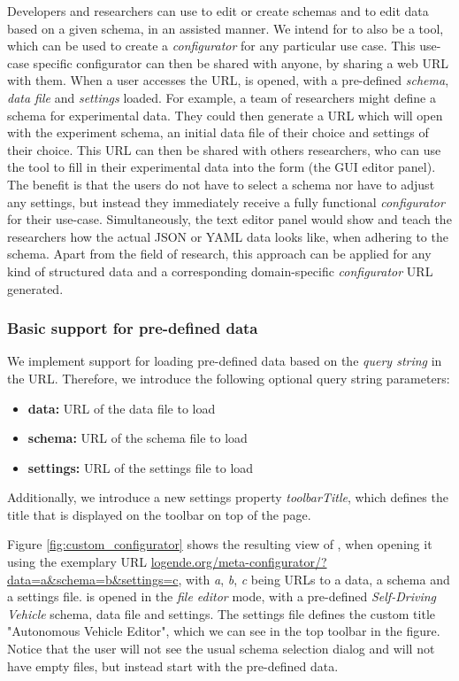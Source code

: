 Developers and researchers can use \toolname{} to edit or create schemas and to edit data based on a given schema, in an assisted manner.
We intend for \toolname{} to also be a tool, which can be used to create a \textit{configurator} for any particular use case.
This use-case specific configurator can then be shared with anyone, by sharing a web URL with them.
When a user accesses the URL, \toolname{} is opened, with a pre-defined \textit{schema}, \textit{data file} and \textit{settings} loaded.
For example, a team of researchers might define a schema for experimental data. 
They could then generate a URL which will open \toolname{} with the experiment schema, an initial data file of their choice and settings of their choice.
This URL can then be shared with others researchers, who can use the tool to fill in their experimental data into the form (the GUI editor panel).
The benefit is that the users do not have to select a schema nor have to adjust any settings, but instead they immediately receive a fully functional \textit{configurator} for their use-case.
Simultaneously, the text editor panel would show and teach the researchers how the actual JSON or YAML data looks like, when adhering to the schema.
Apart from the field of research, this approach can be applied for any kind of structured data and a corresponding domain-specific \textit{configurator} URL generated.

\subsubsection{Basic support for pre-defined data}\label{subsubsec:custom_configurator_basic}
We implement support for loading pre-defined data based on the \textit{query string} in the URL.
Therefore, we introduce the following optional query string parameters:
\begin{itemize}
	\item \textbf{data:} URL of the data file to load
	\item \textbf{schema:} URL of the schema file to load
	\item \textbf{settings:} URL of the settings file to load
\end{itemize}

Additionally, we introduce a new settings property \textit{toolbarTitle}, which defines the title that is displayed on the \toolname{} toolbar on top of the page.

Figure \ref{fig:custom_configurator} shows the resulting view of \toolname{}, when opening it using the exemplary URL \underline{logende.org/meta-configurator/?data=a\&schema=b\&settings=c}, with \textit{a}, \textit{b}, \textit{c} being URLs to a data, a schema and a settings file.
\toolname{} is opened in the \textit{file editor} mode, with a pre-defined \textit{Self-Driving Vehicle} schema, data file and settings.
The settings file defines the custom title "Autonomous Vehicle Editor", which we can see in the top toolbar in the figure.
Notice that the user will not see the usual schema selection dialog and will not have empty files, but instead start with the pre-defined data.


